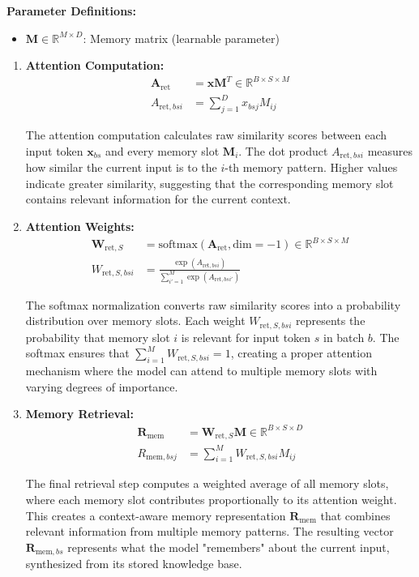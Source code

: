 \documentclass{article}
\begin{document}
\textbf{Parameter Definitions:}
\begin{itemize}
\item $\mathbf{M} \in \mathbb{R}^{M \times D}$: Memory matrix (learnable parameter)
\end{itemize}

\begin{enumerate}
\item \textbf{Attention Computation:}
\begin{align}
\mathbf{A}_{\text{ret}} &= \mathbf{x} \mathbf{M}^T \in \mathbb{R}^{B \times S \times M} \\
A_{\text{ret},bsi} &= \sum_{j=1}^{D} x_{bsj} M_{ij}
\end{align}

The attention computation calculates raw similarity scores between each input token $\mathbf{x}_{bs}$ and every memory slot $\mathbf{M}_i$. The dot product $A_{\text{ret},bsi}$ measures how similar the current input is to the $i$-th memory pattern. Higher values indicate greater similarity, suggesting that the corresponding memory slot contains relevant information for the current context.

\item \textbf{Attention Weights:}
\begin{align}
\mathbf{W}_{\text{ret},S} &= \text{softmax}(\mathbf{A}_{\text{ret}}, \text{dim}=-1) \in \mathbb{R}^{B \times S \times M} \\
W_{\text{ret},S,bsi} &= \frac{\exp(A_{\text{ret},bsi})}{\sum_{i'=1}^{M} \exp(A_{\text{ret},bsi'})}
\end{align}

The softmax normalization converts raw similarity scores into a probability distribution over memory slots. Each weight $W_{\text{ret},S,bsi}$ represents the probability that memory slot $i$ is relevant for input token $s$ in batch $b$. The softmax ensures that $\sum_{i=1}^{M} W_{\text{ret},S,bsi} = 1$, creating a proper attention mechanism where the model can attend to multiple memory slots with varying degrees of importance.

\item \textbf{Memory Retrieval:}
\begin{align}
\mathbf{R}_{\text{mem}} &= \mathbf{W}_{\text{ret},S} \mathbf{M} \in \mathbb{R}^{B \times S \times D} \\
R_{\text{mem},bsj} &= \sum_{i=1}^{M} W_{\text{ret},S,bsi} M_{ij}
\end{align}

The final retrieval step computes a weighted average of all memory slots, where each memory slot contributes proportionally to its attention weight. This creates a context-aware memory representation $\mathbf{R}_{\text{mem}}$ that combines relevant information from multiple memory patterns. The resulting vector $\mathbf{R}_{\text{mem},bs}$ represents what the model "remembers" about the current input, synthesized from its stored knowledge base.


\end{enumerate}
\end{document}
